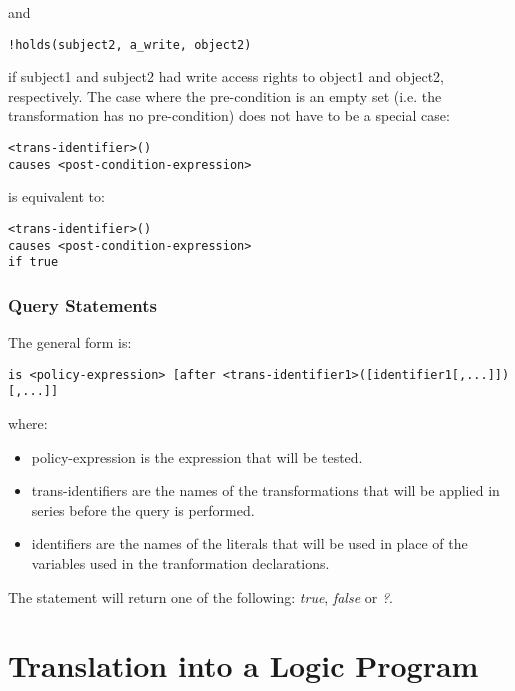 \documentclass[a4paper]{article}
\begin{document}
        and

\begin{verbatim}
!holds(subject2, a_write, object2)
\end{verbatim}

        if subject1 and subject2 had write access rights to object1 and
        object2, respectively. The case where the pre-condition is an
        empty set (i.e. the transformation has no pre-condition) does not 
        have to be a special case:

\begin{verbatim}
<trans-identifier>()
causes <post-condition-expression>
\end{verbatim}

        is equivalent to:

\begin{verbatim}
<trans-identifier>()
causes <post-condition-expression>
if true
\end{verbatim}

      \subsubsection{Query Statements}

        The general form is:

\begin{verbatim}
is <policy-expression> [after <trans-identifier1>([identifier1[,...]])[,...]]
\end{verbatim}

        where:

        \begin{itemize}
          \item
            policy-expression is the expression that will be tested.
          \item
            trans-identifiers are the names of the transformations that will
            be applied in series before the query is performed.
          \item
            identifiers are the names of the literals that will be used in
            place of the variables used in the tranformation declarations.
        \end{itemize}

    The statement will return one of the following: \emph{true}, \emph{false}
    or \emph{?}.

    \pagebreak

  \section{Translation into a Logic Program}
\end{document}
